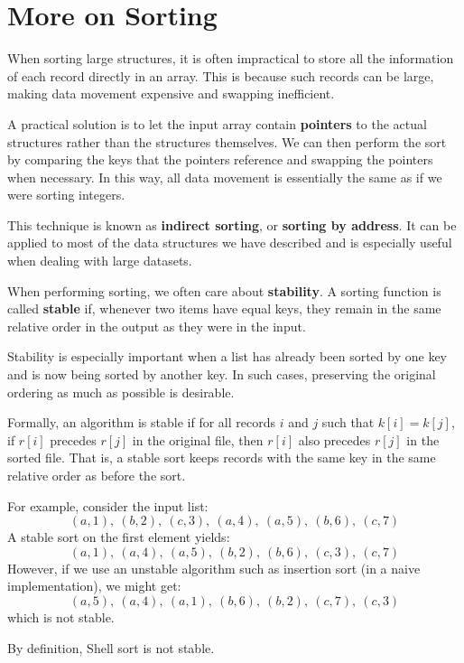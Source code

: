\section{More on Sorting}
When sorting large structures, it is often impractical to store all the information of each record directly in an array. This is because such records can be large, making data movement expensive and swapping inefficient. 

A practical solution is to let the input array contain \textbf{pointers} to the actual structures rather than the structures themselves. We can then perform the sort by comparing the keys that the pointers reference and swapping the pointers when necessary. In this way, all data movement is essentially the same as if we were sorting integers.

This technique is known as \textbf{indirect sorting}, or \textbf{sorting by address}. It can be applied to most of the data structures we have described and is especially useful when dealing with large datasets.

When performing sorting, we often care about \textbf{stability}. A sorting function is called \textbf{stable} if, whenever two items have equal keys, they remain in the same relative order in the output as they were in the input. 

Stability is especially important when a list has already been sorted by one key and is now being sorted by another key. In such cases, preserving the original ordering as much as possible is desirable.

Formally, an algorithm is stable if for all records \(i\) and \(j\) such that \(k[i] = k[j]\), if \(r[i]\) precedes \(r[j]\) in the original file, then \(r[i]\) also precedes \(r[j]\) in the sorted file. That is, a stable sort keeps records with the same key in the same relative order as before the sort.

For example, consider the input list:
\[
(a, 1),\ (b, 2),\ (c, 3),\ (a, 4),\ (a, 5),\ (b, 6),\ (c, 7)
\]
A stable sort on the first element yields:
\[
(a, 1),\ (a, 4),\ (a, 5),\ (b, 2),\ (b, 6),\ (c, 3),\ (c, 7)
\]
However, if we use an unstable algorithm such as insertion sort (in a naive implementation), we might get:
\[
(a, 5),\ (a, 4),\ (a, 1),\ (b, 6),\ (b, 2),\ (c, 7),\ (c, 3)
\]
which is not stable.

\begin{remark}
By definition, Shell sort is not stable.
\end{remark}
